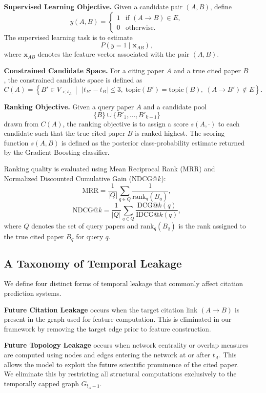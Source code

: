 \documentclass[11pt,a4paper]{article}
\begin{document}
\textbf{Supervised Learning Objective.}
Given a candidate pair \((A,B)\), define
\[
y(A,B)=
\begin{cases}
1 & \text{if } (A \to B)\in E,\\
0 & \text{otherwise}.
\end{cases}
\]
The supervised learning task is to estimate
\[
P\!\left(y=1 \mid \mathbf{x}_{AB}\right),
\]
where \(\mathbf{x}_{AB}\) denotes the feature vector associated with the pair \((A,B)\).

\textbf{Constrained Candidate Space.}
For a citing paper \(A\) and a true cited paper \(B\), the constrained candidate space is defined as
\[
C(A)=
\left\{
B' \in V_{<t_A}
\;\middle|\;
|t_{B'}-t_B| \le 3,\;
\mathrm{topic}(B')=\mathrm{topic}(B),\;
(A \to B') \notin E
\right\}.
\]

\textbf{Ranking Objective.}
Given a query paper \(A\) and a candidate pool
\[
\{B\} \cup \{B'_1,\ldots,B'_{k-1}\}
\]
drawn from \(C(A)\), the ranking objective is to assign a score \(s(A,\cdot)\) to each candidate such that the true cited paper \(B\) is ranked highest. The scoring function \(s(A,B)\) is defined as the posterior class-probability estimate returned by the Gradient Boosting classifier.

Ranking quality is evaluated using Mean Reciprocal Rank (MRR) and Normalized Discounted Cumulative Gain (NDCG@\(k\)):
\[
\mathrm{MRR}
=
\frac{1}{|Q|}
\sum_{q \in Q}
\frac{1}{\mathrm{rank}_q(B_q)},
\]
\[
\mathrm{NDCG@}k
=
\frac{1}{|Q|}
\sum_{q \in Q}
\frac{\mathrm{DCG@}k(q)}
{\mathrm{IDCG@}k(q)},
\]
where \(Q\) denotes the set of query papers and \(\mathrm{rank}_q(B_q)\) is the rank assigned to the true cited paper \(B_q\) for query \(q\).

\subsection{A Taxonomy of Temporal Leakage}

We define four distinct forms of temporal leakage that commonly affect citation prediction systems.

\textbf{Future Citation Leakage} occurs when the target citation link \((A \to B)\) is present in the graph used for feature computation. This is eliminated in our framework by removing the target edge prior to feature construction.

\textbf{Future Topology Leakage} occurs when network centrality or overlap measures are computed using nodes and edges entering the network at or after \(t_A\). This allows the model to exploit the future scientific prominence of the cited paper. We eliminate this by restricting all structural computations exclusively to the temporally capped graph \(G_{t_A-1}\).
\end{document}

